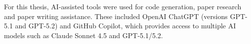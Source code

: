 \documentclass[final,twoside]{vutinfth}
\begin{document}
\begin{table}[t]
\caption{Robustness under image corruptions (mAP$\times$100). For each perturbation type, we report Clean and Low/Mid/High severity. Rows include each model's baseline and selected best-performing temporal aggregation settings.}\label{tab:robustness_map_by_corruption}
\end{table}

\backmatter%

\begin{aitools}
For this thesis, AI-assisted tools were used for code generation, paper research and paper writing assistance. These included OpenAI ChatGPT (versions GPT-5.1 and GPT-5.2) and GitHub Copilot, which provides access to multiple AI models such as Claude Sonnet 4.5 and GPT-5.1/5.2.
\end{aitools}

\listoffigures %

\cleardoublepage%
\listoftables %

\listofalgorithms%

\printindex %

\printglossaries%



\end{document}
